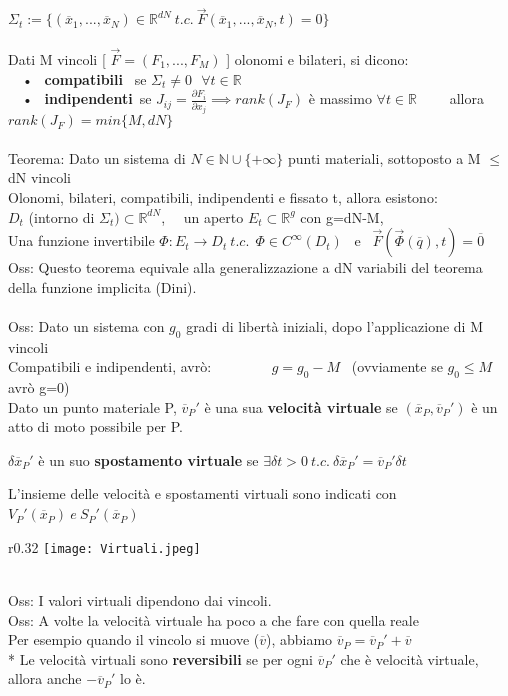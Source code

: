 \documentclass{article}
\begin{document}
$\Sigma_t := \{ (\overline{x}_1, ..., \overline{x}_N) \in \mathbb{R}^{dN} \ t.c. \ \overrightarrow{F}(\overline{x}_1, ..., \overline{x}_N, t ) = 0 \}$ \\ \\
%
%
%
Dati M vincoli [ $\overrightarrow{F} = (F_1,...,F_M)$ ] olonomi e bilateri, si dicono:\\
\ \ • \ \textbf{compatibili} \ se $\Sigma_t \neq 0 \ \ \ \forall t \in \mathbb{R}$ \\
\ \ • \ \textbf{indipendenti}\ se $J_{ij}= \frac{\partial F_i}{\partial x_j} \implies rank(J_F)$ è massimo $\forall t \in \mathbb{R}$ \ \ \ \ allora $rank(J_F) = min \{ M,dN\} $ \\ \\
%
%
%
Teorema: Dato un sistema di $N\in\mathbb{N} \cup \{ +\infty \}$ punti materiali, sottoposto a M $\leq$ dN vincoli \\
\phantom{\ } Olonomi, bilateri, compatibili, indipendenti e fissato t, allora esistono: \\
\phantom{\ } $D_t$ (intorno di $\Sigma_t)\subset \mathbb{R}^{dN}$, \ \ un aperto $E_t\subset\mathbb{R}^g$ con g=dN-M, \\ 
\phantom{\ } Una funzione invertibile $\Phi : E_t \rightarrow D_t \ t.c. \ \ \Phi \in C^\infty(D_t)$ \ e \ $\overrightarrow{F}(\overrightarrow{\Phi}(\overline{q}),t) = \overline{0}$ \\
Oss: Questo teorema equivale alla generalizzazione a dN variabili del teorema della funzione implicita (Dini). \\ \\
%
%
%
Oss: Dato un sistema con $g_0$ gradi di libertà iniziali, dopo l'applicazione di M vincoli \\
\phantom{Oss: }Compatibili e indipendenti, avrò: \ \ \ \ \ \ \ \ $g=g_0-M$ \ (ovviamente se $g_0 \leq M$ avrò g=0) \pagebreak \\
%
%
%
Dato un punto materiale P, $\overline{v}_P'$ è una sua \textbf{velocità virtuale} se $(\overline{x}_P,\overline{v}_P')$ è un atto di moto possibile per P.

$\delta\overline{x}_P'$ è un suo \textbf{spostamento virtuale} se $\exists \delta t > 0 \ t.c. \ \delta\overline{x}_P' = \overline{v}_P'\delta t $

L'insieme delle velocità e spostamenti virtuali sono indicati con $V_P'(\overline{x}_P) \ e \ S_P'(\overline{x}_P)$ \ \ \ \ \ \ \ \ \ \ \
%
%
%
\begin{wrapfigure}{r}{0.32\textwidth}
\texttt{[image: Virtuali.jpeg]}
\end{wrapfigure} \\
%
Oss: I valori virtuali dipendono dai vincoli.\\
Oss: A volte la velocità virtuale ha poco a che fare con quella reale \\
\phantom{Oss: }Per esempio quando il vincolo si muove ($\overline{v}$), abbiamo $\overline{v}_P = \overline{v}_P' + \overline{v}$  \ \\*
%
%
%
Le velocità virtuali sono \textbf{reversibili} se per ogni $\overline{v}_P'$ che è velocità virtuale, allora anche $-\overline{v}_P'$ lo è.
\end{document}
